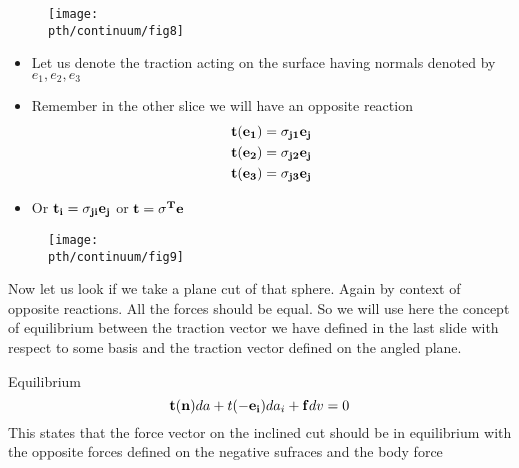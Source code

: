 	\begin{frame}
		\begin{figure}
			\centering
			\texttt{[image: \\pth/continuum/fig8]}
		\end{figure}
	
		\begin{itemize}
			\item Let us denote the traction acting on the surface having normals denoted by $e_1, e_2,e_3$
			\item Remember in the other slice we will have an opposite reaction
			\begin{equation}
			\begin{aligned}
			\mathbf{t(e_1) = \sigma_{j1}e_j} \\\mathbf{t(e_2) = \sigma_{j2}e_j}\\\mathbf{t(e_3) = \sigma_{j3}e_j}
			\end{aligned}
			\end{equation}
			\item Or $\mathbf{t_i = \sigma_{ji}e_j}$ or $\mathbf{t = \sigma^T e}$
		\end{itemize}
	\end{frame}

	\begin{frame}
		\begin{figure}
			\centering
			\texttt{[image: \\pth/continuum/fig9]}
		\end{figure}
		
		Now let us look if we take a plane cut of that sphere. Again by context of opposite reactions. All the forces should be equal. So we will use here the concept of equilibrium between the traction vector we have defined in the last slide with respect to some basis and the traction vector defined on the angled plane.
		
		\begin{block}{Equilibrium}
			\begin{equation}
			\mathbf{t(n)}da + t(\mathbf{-e_i})da_i + \mathbf{f}dv = 0
			\end{equation}
			This states that the force vector on the inclined cut should be in equilibrium with the opposite forces defined on the negative sufraces and the body force
		\end{block}
	
	\end{frame}

